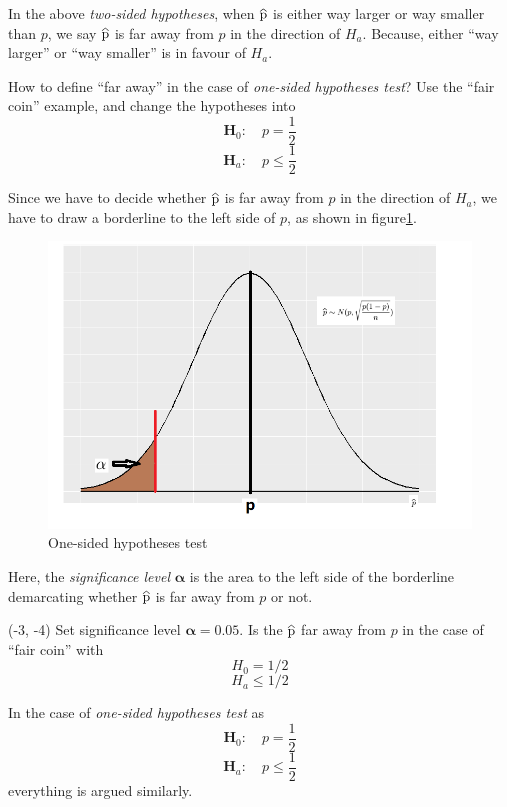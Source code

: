 \documentclass[a4paper, 12pt,twoside]{book}
\newcommand\reallywidehat[1]{%
\savestack{\tmpbox}{\stretchto{%
  \scaleto{%
    \scalerel*[\widthof{\ensuremath{#1}}]{\kern-.6pt\bigwedge\kern-.6pt}%
    {\rule[-\textheight/2]{1ex}{\textheight}}%
  }{\textheight}%
}{0.5ex}}%
\stackon[1pt]{#1}{\tmpbox}%
}
\begin{document}
\begin{itemize}
In the above \textit{two-sided hypotheses}, when $\reallywidehat{p}$ is either way larger or way smaller than $p$, we say $\reallywidehat{p}$ is far away from $p$ in the direction of $H_a$. Because, either ``way larger'' or ``way smaller'' is in favour of $H_a$.\vspace{0.3cm}

How to define ``far away'' in the case of \textit{one-sided hypotheses test}? Use the ``fair coin'' example, and change the hypotheses into 
    $$\textbf{H}_0:\quad p=\frac{1}{2}$$
$$\textbf{H}_a:\quad p\leq \frac{1}{2}$$ 

Since we have to decide whether  $\reallywidehat{p}$ is far away from $p$ in the direction of $H_a$, we have to draw a borderline to the left side of $p$, as shown in figure\ref{OneSidedHT}.    
     \begin{figure}[H]
     \centering
     \includegraphics[scale=0.6]{OneSidedHT}
     \caption{One-sided hypotheses test}
     \label{OneSidedHT}
     \end{figure}
Here, the \textit{significance level} $\mathbf{\alpha}$ is the area to the left side of the borderline demarcating whether $\reallywidehat{p}$ is far away from $p$ or not.

\begin{textblock}{3.6}(-3, -4)
Set significance level $\mathbf{\alpha} = 0.05$. Is the $\reallywidehat{p}$ far away from $p$ in the case of ``fair coin'' with $$H_0 = 1/2$$ $$H_a \leq 1/2$$
\end{textblock}
\vspace{0.6cm}

In the case of \textit{one-sided hypotheses test} as
    $$\textbf{H}_0:\quad p=\frac{1}{2}$$
$$\textbf{H}_a:\quad p\leq \frac{1}{2}$$ 
everything is argued similarly.\vspace{0.6cm}


\end{itemize}
\end{document}

